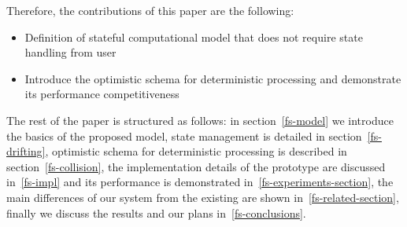 Therefore, the contributions of this paper are the following:

\begin {itemize}
\item Definition of stateful computational model that does not require state handling from user
\item Introduce the optimistic schema for deterministic processing and demonstrate its performance competitiveness
\end {itemize}

The rest of the paper is structured as follows: in section~\ref{fs-model} we introduce the basics of the proposed model, state management is detailed in section~\ref{fs-drifting}, optimistic schema for deterministic processing is described in section~\ref{fs-collision}, the implementation details of the prototype are discussed in~\ref{fs-impl} and its performance is demonstrated in~\ref{fs-experiments-section}, the main differences of our system from the existing are shown in~\ref{fs-related-section}, finally we discuss the results and our plans in~\ref{fs-conclusions}.

\endinput